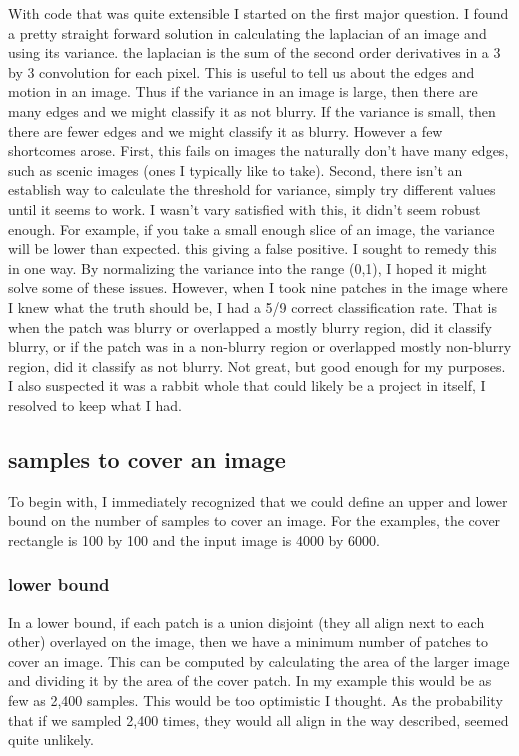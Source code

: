 \documentclass[11pt]{article}
\begin{document}
With code that was quite extensible I started on the first major question.
I found a pretty straight forward solution in calculating the laplacian
of an image and using its variance. the laplacian is the sum of the second order
derivatives in a 3 by 3 convolution for each pixel. This is useful to tell us
about the edges and motion in an image. Thus if the variance in an image
is large, then there are many edges and we might classify it as not blurry.
If the variance is small, then there are fewer edges and we might classify
it as blurry. However a few shortcomes arose. First, this fails on images
the naturally don't have many edges, such as scenic images (ones I typically
like to take). Second, there isn't an establish way to calculate the threshold
for variance, simply try different values until it seems to work. I wasn't
vary satisfied with this, it didn't seem robust enough. For example, if you
take a small enough slice of an image, the variance will be lower than expected.
this giving a false positive. I sought to remedy this in one way. By normalizing
the variance into the range (0,1), I hoped it might solve some of these issues.
However, when I took nine patches in the image where I knew what the truth should
be, I had a 5/9 correct classification rate. That is when the patch was blurry
or overlapped a mostly blurry region, did it classify blurry, or if the patch
was in a non-blurry region or overlapped mostly non-blurry region, did it classify
as not blurry. Not great, but good enough for my purposes. I also suspected it
was a rabbit whole that could likely be a project in itself,
I resolved to keep what I had.

\subsection*{samples to cover an image}

To begin with, I immediately recognized that we could define an upper and lower
bound on the number of samples to cover an image. For the examples, the
cover rectangle is 100 by 100 and the input image is 4000 by 6000.

\subsubsection*{lower bound}

In a lower bound, if each patch is a union disjoint (they all align next to each
other) overlayed on the image, then we have a minimum number of patches to cover
an image. This can be computed by calculating the area of the larger image and
dividing it by the area of the cover patch. In my example this would be as
few as 2,400 samples. This would be too optimistic I thought. As the
probability that if we sampled 2,400 times, they would all align in the way
described, seemed quite unlikely. 
\end{document}
